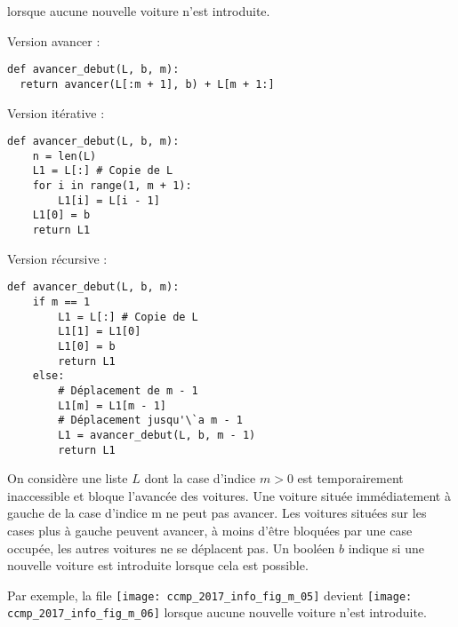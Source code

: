 lorsque aucune nouvelle voiture n'est introduite.



\ifprof
\begin{corrige}
Version avancer :
\begin{lstlisting}
def avancer_debut(L, b, m):
  return avancer(L[:m + 1], b) + L[m + 1:]
\end{lstlisting}

Version itérative :
\begin{lstlisting}
def avancer_debut(L, b, m):
    n = len(L)
    L1 = L[:] # Copie de L
    for i in range(1, m + 1):
        L1[i] = L[i - 1]
    L1[0] = b
    return L1
\end{lstlisting}



Version récursive : 
\begin{lstlisting}
def avancer_debut(L, b, m):
    if m == 1
        L1 = L[:] # Copie de L
        L1[1] = L1[0]
        L1[0] = b
        return L1
    else:
        # Déplacement de m - 1
        L1[m] = L1[m - 1]   
        # Déplacement jusqu'\`a m - 1
        L1 = avancer_debut(L, b, m - 1) 
        return L1
\end{lstlisting}
\end{corrige}
\else
\fi

On considère une liste $L$ dont la case d'indice $m > 0$ est temporairement inaccessible et
bloque l'avancée des voitures. Une voiture située immédiatement à gauche de la case d'indice m ne
peut pas avancer. Les voitures situées sur les cases plus à gauche peuvent avancer, à moins d'être
bloquées par une case occupée, les autres voitures ne se déplacent pas. Un booléen $b$ indique si une
nouvelle voiture est introduite lorsque cela est possible.

Par exemple, la file \texttt{[image: ccmp\_2017\_info\_fig\_m\_05]}
 devient \texttt{[image: ccmp\_2017\_info\_fig\_m\_06]}
lorsque aucune nouvelle voiture n'est introduite.


